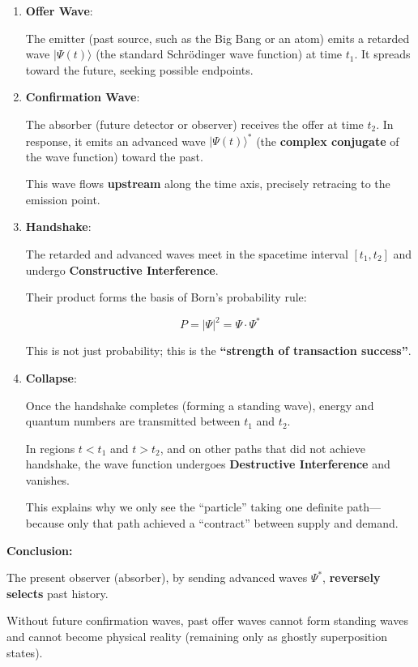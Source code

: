\begin{enumerate}
\item \textbf{Offer Wave}:

The emitter (past source, such as the Big Bang or an atom) emits a retarded wave $|\Psi(t)\rangle$ (the standard Schrödinger wave function) at time $t_1$. It spreads toward the future, seeking possible endpoints.

\item \textbf{Confirmation Wave}:

The absorber (future detector or observer) receives the offer at time $t_2$. In response, it emits an advanced wave $|\Psi(t)\rangle^*$ (the \textbf{complex conjugate} of the wave function) toward the past.

This wave flows \textbf{upstream} along the time axis, precisely retracing to the emission point.

\item \textbf{Handshake}:

The retarded and advanced waves meet in the spacetime interval $[t_1, t_2]$ and undergo \textbf{Constructive Interference}.

Their product forms the basis of Born's probability rule:

\[P = |\Psi|^2 = \Psi \cdot \Psi^*\]

This is not just probability; this is the \textbf{``strength of transaction success''}.

\item \textbf{Collapse}:

Once the handshake completes (forming a standing wave), energy and quantum numbers are transmitted between $t_1$ and $t_2$.

In regions $t < t_1$ and $t > t_2$, and on other paths that did not achieve handshake, the wave function undergoes \textbf{Destructive Interference} and vanishes.

This explains why we only see the ``particle'' taking one definite path---because only that path achieved a ``contract'' between supply and demand.
\end{enumerate}

\textbf{Conclusion:}

The present observer (absorber), by sending advanced waves $\Psi^*$, \textbf{reversely selects} past history.

Without future confirmation waves, past offer waves cannot form standing waves and cannot become physical reality (remaining only as ghostly superposition states).


